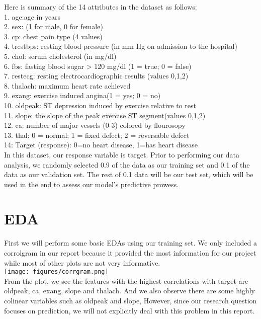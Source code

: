 \documentclass{article}
\begin{document}
Here is summary of the 14 attributes in the dataset as follows: \\
1. age:age in years  \\
2. sex: (1 for male, 0 for female)  \\
3. cp: chest pain type (4 values)  \\
4. trestbps: resting blood pressure (in mm Hg on admission to the hospital)  \\
5. chol: serum cholesterol (in mg/dl)  \\
6. fbs: fasting blood sugar > 120 mg/dl (1 = true; 0 = false)  \\
7. restecg: resting electrocardiographic results (values 0,1,2)  \\
8. thalach: maximum heart rate achieved  \\
9. exang: exercise induced angina(1 = yes; 0 = no)  \\
10. oldpeak: ST depression induced by exercise relative to rest  \\
11. slope: the slope of the peak exercise ST segment(values 0,1,2)  \\
12. ca: number of major vessels (0-3) colored by flourosopy  \\
13. thal: 0 = normal; 1 = fixed defect; 2 = reversable defect  \\
14: Target (response): 0=no heart disease, 1=has heart disease  \\


In this dataset, our response variable is target. Prior to performing our data analysis, we randomly selected 0.9 of the data as our training set and 0.1 of the data as our validation set. The rest of 0.1 data will be our test set, which will be used in the end to assess our model's predictive prowess.  \\

\section{EDA}
First we will perform some basic EDAs using our training set. We only included a corrolgram in our report because it provided the most information for our project while most of other plots are not very informative. \\

\texttt{[image: figures/corrgram.png]}\\

From the plot, we see the features with the highest correlations with target are oldpeak, ca, exang, slope and thalach. And we also observe there are some highly colinear variables such as oldpeak and slope, However, since our research question focuses on prediction, we will not explicitly deal with this problem in this report. \\
\end{document}
